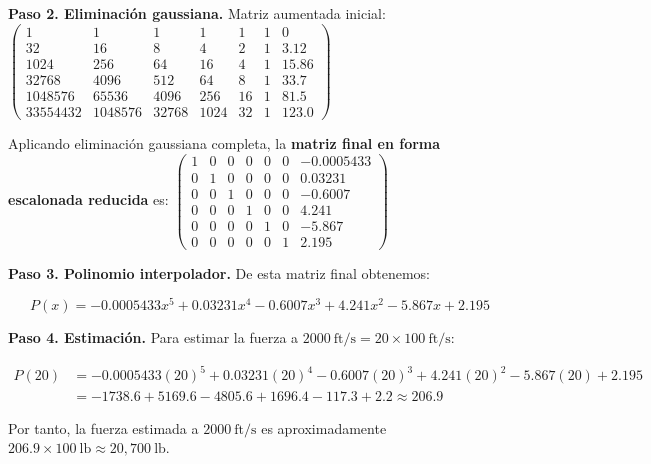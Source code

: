 \begin{prob}
\begin{myproof}
\textbf{Paso 2. Eliminación gaussiana.} Matriz aumentada inicial:
$\left(\begin{array}{cccccc|c}
1 & 1 & 1 & 1 & 1 & 1 & 0 \\
32 & 16 & 8 & 4 & 2 & 1 & 3.12 \\
1024 & 256 & 64 & 16 & 4 & 1 & 15.86 \\
32768 & 4096 & 512 & 64 & 8 & 1 & 33.7 \\
1048576 & 65536 & 4096 & 256 & 16 & 1 & 81.5 \\
33554432 & 1048576 & 32768 & 1024 & 32 & 1 & 123.0
\end{array}\right)$

Aplicando eliminación gaussiana completa, la \textbf{matriz final en forma escalonada reducida} es:
$\left(\begin{array}{cccccc|c}
1 & 0 & 0 & 0 & 0 & 0 & -0.0005433 \\
0 & 1 & 0 & 0 & 0 & 0 & 0.03231 \\
0 & 0 & 1 & 0 & 0 & 0 & -0.6007 \\
0 & 0 & 0 & 1 & 0 & 0 & 4.241 \\
0 & 0 & 0 & 0 & 1 & 0 & -5.867 \\
0 & 0 & 0 & 0 & 0 & 1 & 2.195
\end{array}\right)$

\textbf{Paso 3. Polinomio interpolador.} De esta matriz final obtenemos:

$$P(x) = -0.0005433x^5 + 0.03231x^4 - 0.6007x^3 + 4.241x^2 - 5.867x + 2.195$$

\textbf{Paso 4. Estimación.} Para estimar la fuerza a $2000\ \text{ft}/\text{s} = 20 \times 100\ \text{ft}/\text{s}$:

\begin{align*}
P(20) &= -0.0005433(20)^5 + 0.03231(20)^4 - 0.6007(20)^3 + 4.241(20)^2 - 5.867(20) + 2.195\\
&= -1738.6 + 5169.6 - 4805.6 + 1696.4 - 117.3 + 2.2 \approx 206.9
\end{align*}

Por tanto, la fuerza estimada a $2000\ \text{ft}/\text{s}$ es aproximadamente $\boxed{206.9 \times 100\ \text{lb} \approx 20{,}700\ \text{lb}}$.
\end{myproof}
\end{prob}

